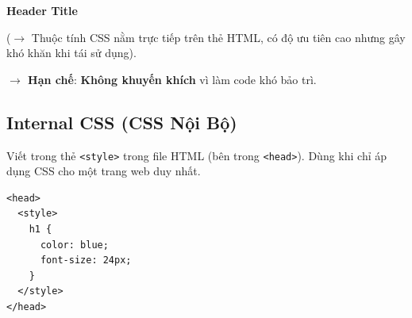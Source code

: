 \documentclass[11pt,oneside]{book}
\newcommand{\codeinline}[1]{\textcolor{accentOrange}{\texttt{#1}}}
\begin{document}
\begin{browserWindow}
\sffamily\small
\begin{tcolorbox}[enhanced, colback=white, colframe=primaryBlue!20, arc=6pt, boxrule=0.8pt, top=10pt, bottom=10pt, left=14pt, right=14pt]
  \begin{tcolorbox}[enhanced, colback=red!4, colframe=red!35, arc=4pt, boxrule=0.8pt, top=8pt, bottom=8pt, left=10pt, right=10pt]
    {\fontsize{30pt}{34pt}\selectfont\bfseries\color{red!85!black} Header Title}\par
    \vspace{4pt}
    \tcbox[on line, arc=3pt, colback=red!10, colframe=red!70!black, boxrule=0.6pt, boxsep=2pt]{%
      \tiny\ttfamily\bfseries\textcolor{red!90!black}{<h1 style="color: red; font-size: 30px;">}%
    }
  \end{tcolorbox}
  \par\vspace{4pt}
  \textcolor{primaryBlue}{\scriptsize ($\rightarrow$ Thuộc tính CSS nằm trực tiếp trên thẻ HTML, có độ ưu tiên cao nhưng gây khó khăn khi tái sử dụng).}
\end{tcolorbox}
\end{browserWindow}
\textcolor{warnBorder}{\textbf{$\rightarrow$ Hạn chế}}: \textcolor{accentOrange}{\textbf{Không khuyến khích}} vì làm code khó bảo trì.

\subsection{Internal CSS (CSS Nội Bộ)}
Viết trong thẻ \codeinline{<style>} trong file HTML (bên trong \codeinline{<head>}). Dùng khi chỉ áp dụng CSS cho một trang web duy nhất.
\begin{codeWindow}
\begin{lstlisting}[language=HTML5]
<head>
  <style>
    h1 {
      color: blue;
      font-size: 24px;
    }
  </style>
</head>
\end{lstlisting}
\end{codeWindow}
\end{document}
